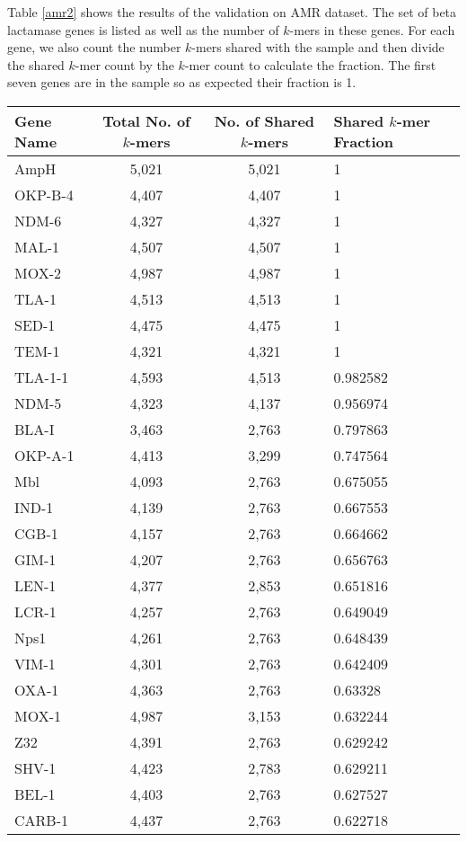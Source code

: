 \documentclass{article}
\begin{document}
Table \ref{amr2} shows the results of the validation on AMR dataset. The set of beta lactamase
genes is listed as well as the number of $k$-mers in these genes. For each gene, we also count the number $k$-mers shared with the sample and then divide the shared $k$-mer count by the $k$-mer count to calculate the fraction. The first seven genes are in the sample so as expected their fraction is 1.

\begin{table}[h!]
  \small
  \centering
  \begin{tabular}{l|c|c|l}
		 Gene Name& Total No. of $k$-mers & No. of Shared $k$-mers&  Shared $k$-mer Fraction 	 \\
	\hline
	\hline
 AmpH & 5,021 & 5,021 & 1\\
OKP-B-4 & 4,407 & 4,407 & 1\\
NDM-6 & 4,327 & 4,327 & 1\\
MAL-1 & 4,507 & 4,507 & 1\\
MOX-2 & 4,987 & 4,987 & 1\\
TLA-1 & 4,513 & 4,513 & 1\\
SED-1 & 4,475 & 4,475 & 1\\
TEM-1 & 4,321 & 4,321 & 1\\
TLA-1-1 & 4,593 & 4,513 & 0.982582\\
NDM-5 & 4,323 & 4,137 & 0.956974\\
BLA-I & 3,463 & 2,763 & 0.797863\\
OKP-A-1 & 4,413 & 3,299 & 0.747564\\
Mbl & 4,093 & 2,763 & 0.675055\\
IND-1 & 4,139 & 2,763 & 0.667553\\
CGB-1 & 4,157 & 2,763 & 0.664662\\
GIM-1 & 4,207 & 2,763 & 0.656763\\
LEN-1 & 4,377 & 2,853 & 0.651816\\
LCR-1 & 4,257 & 2,763 & 0.649049\\
Nps1 & 4,261 & 2,763 & 0.648439\\
VIM-1 & 4,301 & 2,763 & 0.642409\\
OXA-1 & 4,363 & 2,763 & 0.63328\\
MOX-1 & 4,987 & 3,153 & 0.632244\\
Z32 & 4,391 & 2,763 & 0.629242\\
SHV-1 & 4,423 & 2,783 & 0.629211\\
BEL-1 & 4,403 & 2,763 & 0.627527\\
CARB-1 & 4,437 & 2,763 & 0.622718\\

\end{tabular}
\end{table}
\end{document}
